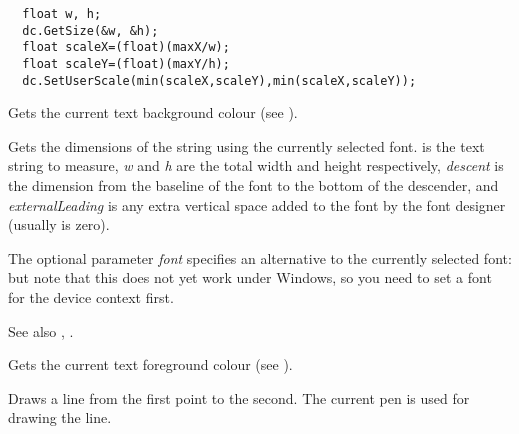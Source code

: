 \begin{verbatim}
  float w, h;
  dc.GetSize(&w, &h);
  float scaleX=(float)(maxX/w);
  float scaleY=(float)(maxY/h);
  dc.SetUserScale(min(scaleX,scaleY),min(scaleX,scaleY));
\end{verbatim}



Gets the current text background colour (see ).

\label{wxdcgettextextent}


Gets the dimensions of the string using the currently selected font.
 is the text string to measure, {\it w} and {\it h} are
the total width and height respectively, {\it descent} is the
dimension from the baseline of the font to the bottom of the
descender, and {\it externalLeading} is any extra vertical space added
to the font by the font designer (usually is zero).

The optional parameter {\it font} specifies an alternative
to the currently selected font: but note that this does not
yet work under Windows, so you need to set a font for
the device context first.

See also , .



Gets the current text foreground colour (see ).



Draws a line from the first point to the second. The current pen is
used for drawing the line.




